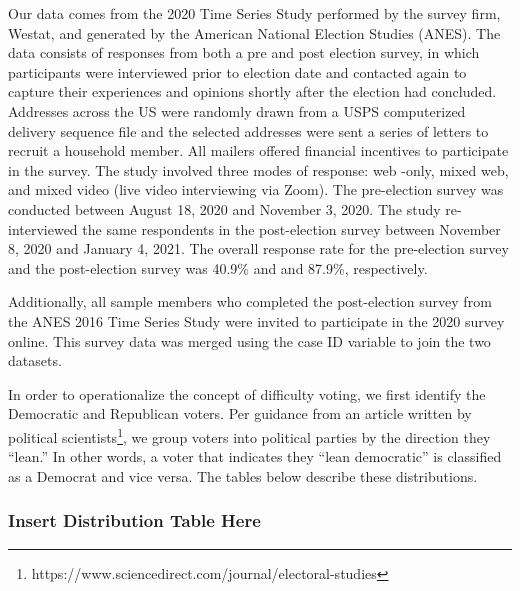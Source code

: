 \documentclass[
]{article}
\begin{document}
Our data comes from the 2020 Time Series Study performed by the survey firm, Westat, and generated by the American National Election Studies (ANES). The data consists of responses from both a pre and post election survey, in which participants were interviewed prior to election date and contacted again to capture their experiences and opinions shortly after the election had concluded. Addresses across the US were randomly drawn from a USPS computerized delivery sequence file and the selected addresses were sent a series of letters to recruit a household member. All mailers offered financial incentives to participate in the survey. The study involved three modes of response: web -only, mixed web, and mixed video (live video interviewing via Zoom). The pre-election survey was conducted between August 18, 2020 and November 3, 2020. The study re-interviewed the same respondents in the post-election survey between November 8, 2020 and January 4, 2021. The overall response rate for the pre-election survey and the post-election survey was 40.9\% and and 87.9\%, respectively.

Additionally, all sample members who completed the post-election survey from the ANES 2016 Time Series Study were invited to participate in the 2020 survey online. This survey data was merged using the case ID variable to join the two datasets.

In order to operationalize the concept of difficulty voting, we first identify the Democratic and Republican voters. Per guidance from an article written by political scientists\footnote{https://www.sciencedirect.com/journal/electoral-studies}, we group voters into political parties by the direction they ``lean.'' In other words, a voter that indicates they ``lean democratic'' is classified as a Democrat and vice versa. The tables below describe these distributions.

\hypertarget{insert-distribution-table-here}{%
\subsubsection{Insert Distribution Table Here}\label{insert-distribution-table-here}}
\end{document}
